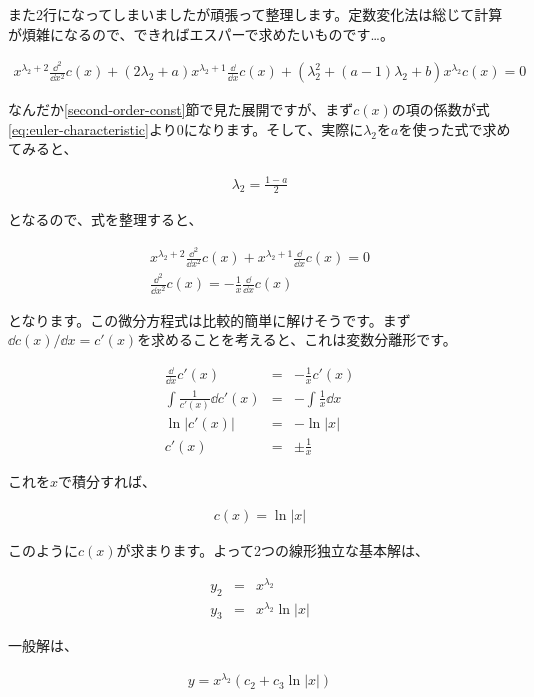 また2行になってしまいましたが頑張って整理します。定数変化法は総じて計算が煩雑になるので、できればエスパーで求めたいものです…。

\begin{eqnarray}
    x^{\lambda_2+2}\frac{\dd^2}{\dd x^2}c(x)+(2\lambda_2+a)x^{\lambda_2+1}\frac{\dd}{\dd x}c(x)+(\lambda_2^2+(a-1)\lambda_2+b)x^{\lambda_2}c(x)=0
\end{eqnarray}

なんだか\ref{second-order-const}節で見た展開ですが、まず$c(x)$の項の係数が式\ref{eq:euler-characteristic}より0になります。そして、実際に$\lambda_2$を$a$を使った式で求めてみると、

\begin{eqnarray}
    \lambda_2=\frac{1-a}{2}
\end{eqnarray}

\noindent
となるので、式を整理すると、

\begin{eqnarray}
    x^{\lambda_2+2}\frac{\dd^2}{\dd x^2}c(x)+x^{\lambda_2+1}\frac{\dd}{\dd x}c(x)=0 \\
    \frac{\dd^2}{\dd x^2}c(x)=-\frac{1}{x}\frac{\dd}{\dd x}c(x)
\end{eqnarray}

\noindent
となります。この微分方程式は比較的簡単に解けそうです。まず$\dd c(x)/\dd x=c'(x)$を求めることを考えると、これは変数分離形です。

\begin{eqnarray}
    \frac{\dd}{\dd x}c'(x)&=&-\frac{1}{x}c'(x) \\
    \int \frac{1}{c'(x)}\dd c'(x)&=&-\int\frac{1}{x}\dd x \nonumber \\
    \ln|c'(x)|&=&-\ln|x| \nonumber \\
    c'(x)&=&\pm\frac{1}{x}
\end{eqnarray}

\noindent
これを$x$で積分すれば、

\begin{eqnarray}
    c(x)=\ln|x|
\end{eqnarray}

\noindent
このように$c(x)$が求まります。よって2つの線形独立な基本解は、

\begin{eqnarray}
    y_2&=&x^{\lambda_2} \nonumber \\
    y_3&=&x^{\lambda_2}\ln|x|
\end{eqnarray}

一般解は、

\begin{eqnarray}
    y=x^{\lambda_2}(c_2+c_3\ln|x|)
\end{eqnarray}

